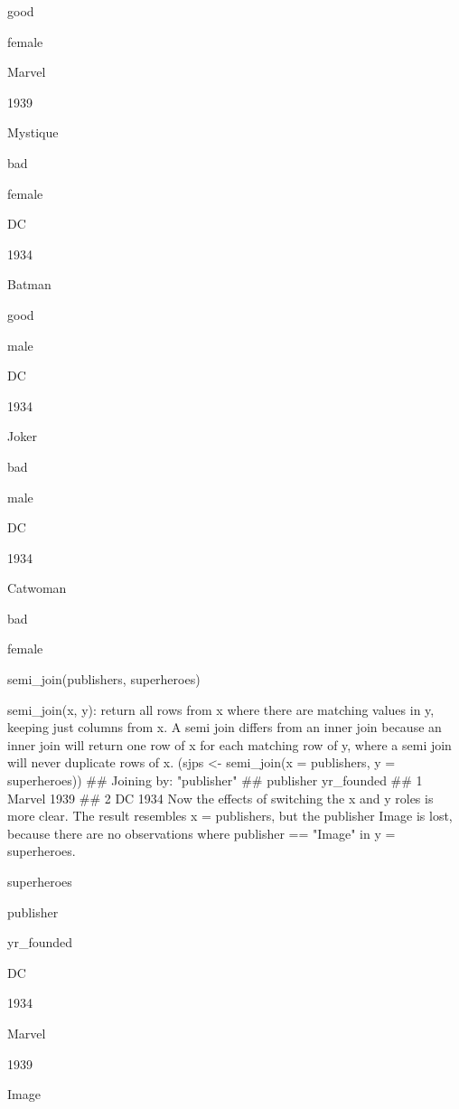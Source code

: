 good
 
female
 


Marvel
 
1939
 
Mystique
 
bad
 
female
 


DC
 
1934
 
Batman
 
good
 
male
 


DC
 
1934
 
Joker
 
bad
 
male
 


DC
 
1934
 
Catwoman
 
bad
 
female
 



semi_join(publishers, superheroes)
 

semi_join(x, y): return all rows from x where there are matching values in y, keeping just columns from x. A semi join differs from an inner join because an inner join will return one row of x for each matching row of y, where a semi join will never duplicate rows of x.
 (sjps <- semi_join(x = publishers, y = superheroes)) ## Joining by: "publisher" ##   publisher yr_founded
## 1    Marvel       1939
## 2        DC       1934 
Now the effects of switching the x and y roles is more clear. The result resembles x = publishers, but the publisher Image is lost, because there are no observations where publisher == "Image" in y = superheroes.
 



superheroes
 


publisher
 
yr_founded
 



DC
 
1934
 


Marvel
 
1939
 


Image
 
